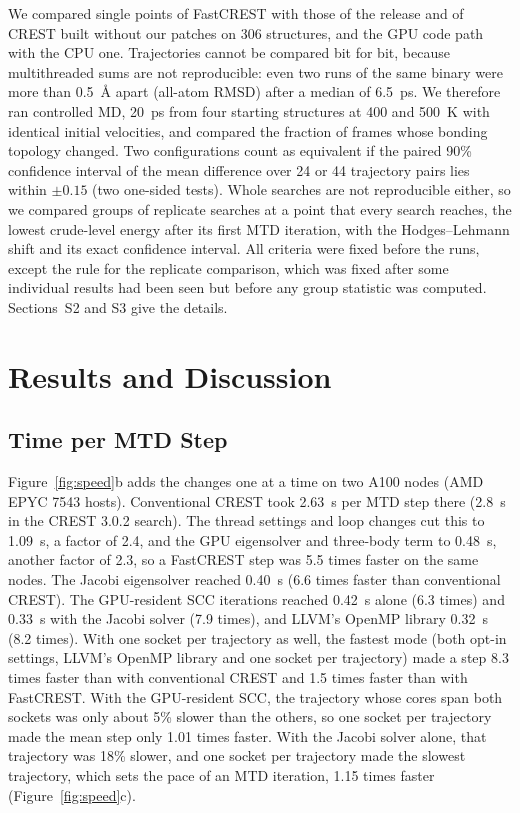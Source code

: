 \documentclass[journal=jctcce,manuscript=article]{achemso}
\begin{document}
We compared single points of FastCREST with those of the release and of CREST built without our patches on 306 structures, and the GPU code path with the CPU one. Trajectories cannot be compared bit for bit, because multithreaded sums are not reproducible:\cite{demmel2015} even two runs of the same binary were more than 0.5~\AA{} apart (all-atom RMSD) after a median of 6.5~ps. We therefore ran controlled MD, 20~ps from four starting structures at 400 and 500~K with identical initial velocities, and compared the fraction of frames whose bonding topology changed. Two configurations count as equivalent if the paired 90\% confidence interval of the mean difference over 24 or 44 trajectory pairs lies within $\pm0.15$ (two one-sided tests\cite{tost}). Whole searches are not reproducible either, so we compared groups of replicate searches at a point that every search reaches, the lowest crude-level energy after its first MTD iteration, with the Hodges--Lehmann shift and its exact confidence interval.\cite{hodges1963,bauer1972} All criteria were fixed before the runs, except the rule for the replicate comparison, which was fixed after some individual results had been seen but before any group statistic was computed. Sections~S2 and S3 give the details.

\section{Results and Discussion}

\subsection{Time per MTD Step}
\label{sec:step}

Figure~\ref{fig:speed}b adds the changes one at a time on two A100 nodes (AMD EPYC 7543 hosts). Conventional CREST took 2.63~s per MTD step there (2.8~s in the CREST 3.0.2 search). The thread settings and loop changes cut this to 1.09~s, a factor of 2.4, and the GPU eigensolver and three-body term to 0.48~s, another factor of 2.3, so a FastCREST step was 5.5 times faster on the same nodes. The Jacobi eigensolver reached 0.40~s (6.6 times faster than conventional CREST). The GPU-resident SCC iterations reached 0.42~s alone (6.3 times) and 0.33~s with the Jacobi solver (7.9 times), and LLVM's OpenMP library 0.32~s (8.2 times). With one socket per trajectory as well, the fastest mode (both opt-in settings, LLVM's OpenMP library and one socket per trajectory) made a step 8.3 times faster than with conventional CREST and 1.5 times faster than with FastCREST. With the GPU-resident SCC, the trajectory whose cores span both sockets was only about 5\% slower than the others, so one socket per trajectory made the mean step only 1.01 times faster. With the Jacobi solver alone, that trajectory was 18\% slower, and one socket per trajectory made the slowest trajectory, which sets the pace of an MTD iteration, 1.15 times faster (Figure~\ref{fig:speed}c).
\end{document}
